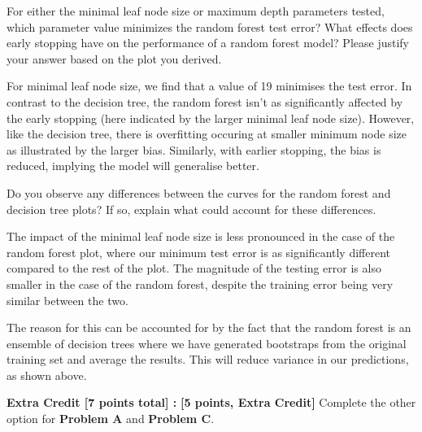 \problem[6]
For either the minimal leaf node size or maximum depth parameters tested, which parameter value minimizes the random forest test error? What effects does early stopping have on the performance of a random forest model?
Please justify your answer based on the plot you derived.

\begin{solution}
 For minimal leaf node size, we find that a value of 19 minimises the test error. In contrast to the decision tree, the random forest isn't as significantly affected by the early stopping (here indicated by the larger minimal leaf node size). However, like the decision tree, there is overfitting occuring at smaller minimum node size as illustrated by the larger bias. Similarly, with earlier stopping, the bias is reduced, implying the model will generalise better.
\end{solution}

\problem[4]
Do you observe any differences between the curves for the random forest and decision tree plots? If so, explain what could account for these differences.

\begin{solution}
 The impact of the minimal leaf node size is less pronounced in the case of the random forest plot, where our minimum test error is as significantly different compared to the rest of the plot. The magnitude of the testing error is also smaller in the case of the random forest, despite the training error being very similar between the two.

 The reason for this can be accounted for by the fact that the random forest is an ensemble of decision trees where we have generated bootstraps from the original training set and average the results. This will reduce variance in our predictions, as shown above.
\end{solution}

\textbf{Extra Credit [7 points total] :} \problem\textbf{[5 points, Extra Credit]} Complete the other option for \textbf{Problem A }and \textbf{Problem C}.

